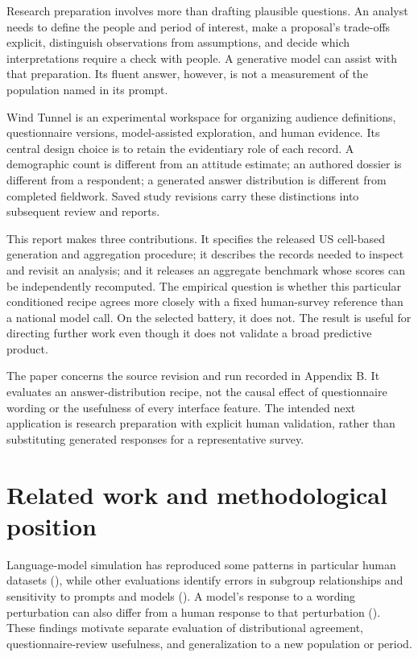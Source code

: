 \documentclass[
  11pt,
]{article}
\let\originalsection\section
\renewcommand{\section}{\Needspace{5\baselineskip}\originalsection}
\begin{document}
Research preparation involves more than drafting plausible questions. An
analyst needs to define the people and period of interest, make a
proposal's trade-offs explicit, distinguish observations from
assumptions, and decide which interpretations require a check with
people. A generative model can assist with that preparation. Its fluent
answer, however, is not a measurement of the population named in its
prompt.

Wind Tunnel is an experimental workspace for organizing audience
definitions, questionnaire versions, model-assisted exploration, and
human evidence. Its central design choice is to retain the evidentiary
role of each record. A demographic count is different from an attitude
estimate; an authored dossier is different from a respondent; a
generated answer distribution is different from completed fieldwork.
Saved study revisions carry these distinctions into subsequent review
and reports.

This report makes three contributions. It specifies the released US
cell-based generation and aggregation procedure; it describes the
records needed to inspect and revisit an analysis; and it releases an
aggregate benchmark whose scores can be independently recomputed. The
empirical question is whether this particular conditioned recipe agrees
more closely with a fixed human-survey reference than a national model
call. On the selected battery, it does not. The result is useful for
directing further work even though it does not validate a broad
predictive product.

The paper concerns the source revision and run recorded in Appendix B.
It evaluates an answer-distribution recipe, not the causal effect of
questionnaire wording or the usefulness of every interface feature. The
intended next application is research preparation with explicit human
validation, rather than substituting generated responses for a
representative survey.

\section{Related work and methodological
position}\label{related-work-and-methodological-position}

Language-model simulation has reproduced some patterns in particular
human datasets (), while
other evaluations identify errors in subgroup relationships and
sensitivity to prompts and models (). A model's response to a wording perturbation can also differ
from a human response to that perturbation
(). These findings
motivate separate evaluation of distributional agreement,
questionnaire-review usefulness, and generalization to a new population
or period.
\end{document}
